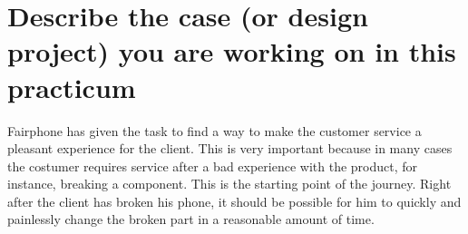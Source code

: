 \section{Describe the case (or design project) you are working on in this practicum}
Fairphone has given the task to find a way to make the customer service a pleasant experience for the client. This is very important because in many cases the costumer requires service after a bad experience with the product, for instance, breaking a component. This is the starting point of the journey. Right after the client has broken his phone, it should be possible for him to quickly and painlessly change the broken part in a reasonable amount of time.